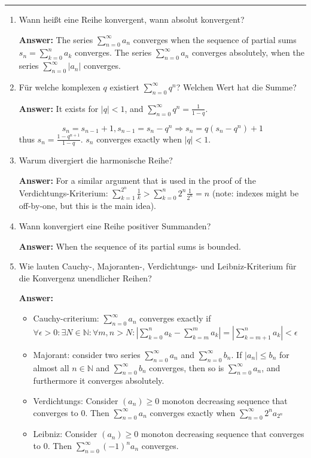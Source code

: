 \documentclass[11pt]{article}
\newcommand{\abs}[1]{\left|#1\right|}
\newcommand{\sumn}[4]{\sum_{#1=#2}^{#3}{#4}}
\begin{document}
\Large




\medskip\hrule
\begin{enumerate}
    \item Wann heißt eine Reihe konvergent, wann absolut konvergent?
    
    \textbf{Answer:} The series $\sumn{n}{0}{\infty}{a_n}$ converges when the sequence of partial sums $s_n = \sumn{k}{0}{n}{a_k}$ converges. The series $\sumn{n}{0}{\infty}{a_n}$ converges absolutely, when the series $\sumn{n}{0}{\infty}{\abs{a_n}}$ converges.

    \item  Für welche komplexen $q$ existiert $\sum_{n=0}^\infty {q^n}$? Welchen Wert hat die Summe?
    
    \textbf{Answer:} It exists for $\abs{q} < 1$, and $\sum_{n=0}^\infty {q^n} = \frac{1}{1-q}$. 
    
    $$s_n = s_{n-1} + 1, s_{n-1} = s_n - q^n \Rightarrow s_n = q(s_n - q^n)+1$$
    thus $s_n = \frac{1-q^{n+1}}{1-q}$. $s_n$ converges exactly when $\abs{q} < 1$.

    \item  Warum divergiert die harmonische Reihe?
    
    \textbf{Answer:} For a similar argument that is used in the proof of the Verdichtungs-Kriterium: $\sumn{k}{1}{2^n}{\frac{1}{k}} > \sumn{k}{0}{n}{2^n \frac{1}{2^n}} = n$ (note: indexes might be off-by-one, but this is the main idea).

    \item  Wann konvergiert eine Reihe positiver Summanden?
    
    \textbf{Answer:} When the sequence of its partial sums is bounded.

    \item  Wie lauten Cauchy-, Majoranten-, Verdichtungs- und Leibniz-Kriterium für die Konvergenz unendlicher Reihen?
    
    \textbf{Answer:} \begin{itemize}
        \item Cauchy-criterium: $\sumn{n}{0}{\infty}{a_n}$ converges exactly if $\forall \epsilon > 0\colon  \exists N \in \mathbb{N}\colon \forall m,n > N\colon \abs{\sumn{k}{0}{n}{a_k} - \sumn{k}{m}{m}{a_k}} = \abs{\sumn{k}{m+1}{n}{a_k}} < \epsilon$
        \item Majorant: consider two series $\sumn{n}{0}{\infty}{a_n}$ and $\sumn{n}{0}{\infty}{b_n}$. If $\abs{a_n} \le b_n$ for almost all $n\in \mathbb{N}$ and $\sumn{n}{0}{\infty}{b_n}$ converges, then so is $\sumn{n}{0}{\infty}{a_n}$, and furthermore it converges absolutely.
        \item Verdichtungs: Consider $(a_n) \ge 0$ monoton decreasing sequence that converges to $0$. Then $\sumn{n}{0}{\infty}{a_n}$ converges exactly when $\sumn{n}{0}{\infty}{2^n a_{2^n}}$
        \item Leibniz: Consider $(a_n) \ge 0$ monoton decreasing sequence that converges to $0$. Then $\sumn{n}{0}{\infty}{(-1)^n a_n}$ converges.
    \end{itemize}


\end{enumerate}
\end{document}

